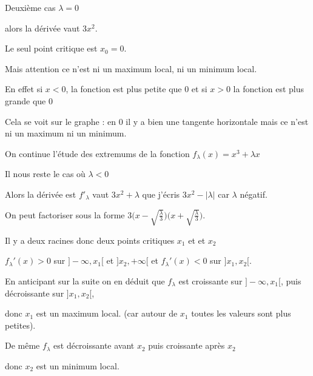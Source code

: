 \change

Deuxième cas $\lambda = 0$ 

alors la dérivée vaut $3x^2$. 

\change 

Le seul point critique est $x_0=0$.

\change


Mais attention ce n'est ni un maximum local, ni un minimum local. 

\change

En effet si $x<0$, la fonction est plus petite que $0$ et si 
 $x>0$ la fonction est plus grande que $0$

\change

Cela se voit sur le graphe : en $0$ il y a bien une 
tangente horizontale mais ce n'est ni un maximum ni un minimum.



\diapo

On continue l'étude des extremums de la fonction $f_\lambda(x)= x^3+\lambda x$

\change

Il nous reste le cas où $\lambda <0$ 

\change

Alors la dérivée est $f'_\lambda$ vaut $3x^2+\lambda$ que j'écris $3x^2-|\lambda|$ car $\lambda$ négatif.

\change

On peut factoriser sous la forme $3\big(x-\sqrt{\frac{\lambda}{3}}\big)\big(x+\sqrt{\frac{\lambda}{3}}\big)$.

\change

Il y a deux racines donc deux points critiques $x_1$ et et $x_2$

\change

 $f_\lambda'(x) > 0$ sur $]-\infty,x_1[$ et $]x_2,+\infty[$
et $f_\lambda'(x) < 0$ sur $]x_1,x_2[$. 

\change

En anticipant sur la suite on en déduit que $f_\lambda$ est croissante sur $]-\infty,x_1[$, puis décroissante sur $]x_1,x_2[$,

\change

donc $x_1$ est un maximum local. (car autour de $x_1$ toutes les valeurs sont plus petites).

\change

De même  $f_\lambda$ est décroissante avant $x_2$ 
puis croissante après $x_2$
\change 

donc $x_2$ est un minimum local.

